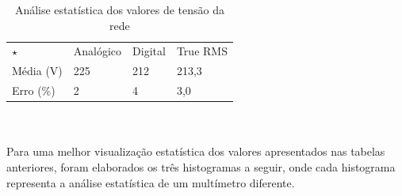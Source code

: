 \documentclass[14pt, oneside]{book}
\newcommand\tab[1][1cm]{\hspace*{#1}}
\theoremstyle{definition}
\begin{document}
                \begin{table}[H]
                    \centering
                    \label{oi}
                    {\renewcommand\arraystretch{1.25}
                    \caption{Análise estatística dos valores de tensão da rede}
                    \begin{tabular}{ l l l l }
                        \cline{1-1}\cline{2-2}\cline{3-3}\cline{4-4}  
                            \multicolumn{1}{|p{3.033cm}|}{$\star$  \centering } &
                            \multicolumn{1}{p{3.033cm}|}{Analógico \centering } &
                            \multicolumn{1}{p{2.267cm}|}{Digital \centering } &
                            \multicolumn{1}{p{4.217cm}|}{True RMS \centering }
                      \\  
                        \cline{1-1}\cline{2-2}\cline{3-3}\cline{4-4}  
                            \multicolumn{1}{|p{3.033cm}|}{Média (V) \centering } &
                            \multicolumn{1}{p{3.033cm}|}{225 \centering } &
                            \multicolumn{1}{p{2.267cm}|}{212 \centering } &
                            \multicolumn{1}{p{4.217cm}|}{213,3 \centering }
                          \\  
                        \cline{1-1}\cline{2-2}\cline{3-3}\cline{4-4}  
                            \multicolumn{1}{|p{3.033cm}|}{Erro (\%) \centering } &
                            \multicolumn{1}{p{3.033cm}|}{2 \centering } &
                            \multicolumn{1}{p{2.267cm}|}{4 \centering } &
                            \multicolumn{1}{p{4.217cm}|}{3,0 \centering }
                          \\  
                        \hline
                    
                    \end{tabular} }
                \end{table} \\~\\
                \tab Para uma melhor visualização estatística dos valores apresentados nas tabelas anteriores, foram elaborados os três histogramas a seguir, onde cada histograma representa a análise estatística de um multímetro diferente.
\end{document}
